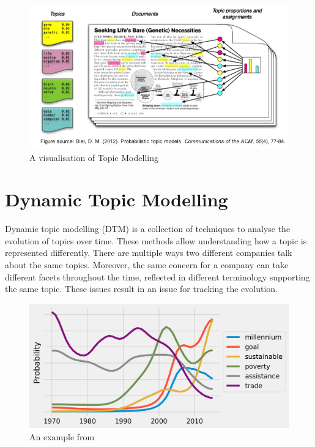 \documentclass[12pt,MSc,a4paper,oneside]{muthesis}
\begin{document}
\begin{figure}[h]
  \centering
  \includegraphics[scale=0.5]{images/abstract/Topic Modelling Example.png}
  \caption{A visualisation of Topic Modelling}
\end{figure}

\section{Dynamic Topic Modelling}

Dynamic topic modelling (DTM) is a collection of techniques to analyse the evolution of topics over time. These methods allow understanding how a topic is represented differently. There are multiple ways two different companies talk about the same topics. Moreover, the same concern for a company can take different facets throughout the time, reflected in different terminology supporting the same topic. These issues result in an issue for tracking the evolution.

\begin{figure}[h]
  \centering
  \includegraphics[scale=0.17]{images/abstract/DTM example.png}
  \caption{An example from \cite{dtm-example}}
\end{figure}
\end{document}
